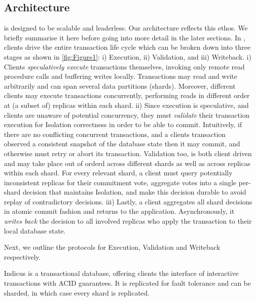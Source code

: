 \subsection{Architecture}
\sys is designed to be scalable and leaderless. Our architecture reflects this ethos. We briefly summarise it here before going into more detail in the later sections. 
In \sys, clients drive the entire transaction life cycle which can be broken down into three stages as shown in \ref{fig:Figure1}: i) Execution, ii) Validation, and iii) Writeback. 
i) Clients \textit{speculatively execute} transactions themselves, invoking only remote read procedure calls and buffering writes locally. Transactions may read and write arbitrarily and can span several data partitions (shards). Moreover, different clients may execute transactions concurrently, performing reads in different order at (a subset of) replicas within each shard. 
ii) Since execution is speculative, and clients are unaware of potential concurrency, they must \textit{validate} their transaction execution for Isolation correctness in order to be able to commit. Intuitively, if there are no conflicting concurrent transactions, and a clients transaction observed a consistent snapshot of the database state then it may commit, and otherwise must retry or abort its transaction. Validation too, is both client driven and may take place out of orderd across different shards as well as across replicas within each shard. For every relevant shard, a client must query potentially inconsistent replicas for their commitment vote, aggregate votes into a single per-shard decision that maintains Isolation, and make this decision durable to avoid replay of contradictory decisions. 
iii) Lastly, a client aggregates all shard decisions in atomic commit fashion and returns to the application. Asynchronously, it \textit{writes back} the decision to all involved replicas who apply the transaction to their local database state.

Next, we outline the protocols for Execution, Validation and Writeback respectively. 

Indicus is a transactional database, offering clients the interface of interactive transactions with ACID guarantees. It is replicated for fault tolerance and can be sharded, in which case every shard is replicated. 

